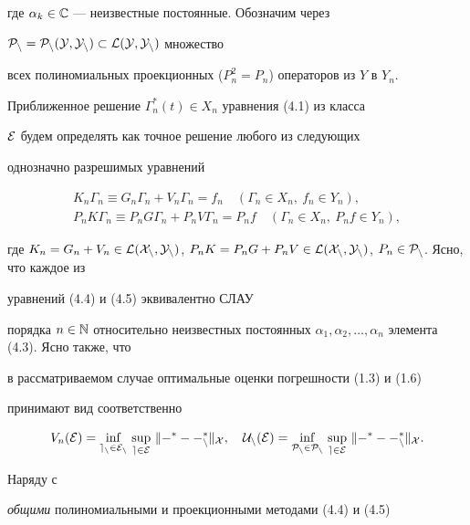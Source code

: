 где $\alpha_k\in \Bbb C$ --- неизвестные постоянные. Обозначим через


$\cal P_n=\cal P_n(Y,Y_n)\subset \cal L(Y,Y_n)$ множество


всех полиномиальных проекционных ($P_n^2=P_n$) операторов из $Y$ в $Y_n$.





Приближенное решение $\Gamma_n^*(t)\in X_n$ уравнения (4.1) из класса


$\cal E$ будем определять как точное решение любого из следующих


однозначно разрешимых уравнений


\begin{gather}


K_n\Gamma_n\equiv G_n\Gamma_n+V_n\Gamma_n=f_n\quad


(\Gamma_n\in X_n,\ f_n\in Y_n), \\


%


P_nK\Gamma_n\equiv P_nG\Gamma_n+P_nV\Gamma_n=P_nf\quad


(\Gamma_n\in X_n,\ P_nf\in Y_n),


\end{gather}


где $K_n=G_n+V_n\in \cal L(X_n, Y_n)$, $P_nK=P_nG+P_nV\in


\cal L(X_n, Y_n)$, $P_n\in \cal P_n$. Ясно, что каждое из


уравнений (4.4) и (4.5) эквивалентно СЛАУ


порядка $n \in \Bbb N$ относительно неизвестных постоянных $\alpha_1,


\alpha_2,\dotsc ,\alpha_n$ элемента (4.3). Ясно также, что


в рассматриваемом случае оптимальные оценки погрешности (1.3) и (1.6)


принимают вид соответственно


$$


V_n(\cal E)=\inf_{\mathstrut e_n\in \cal E_n}\, \sup_{e\in \cal E}\,


\|\Gamma^*-\Gamma_n^*\|_X ,\quad U_n(\cal E)=\inf_{\mathstrut P_n\in


\cal P_n}\, \sup_{e\in \cal E}\, \|\Gamma^*-\Gamma_n^*\|_X .


$$





Наряду с


{\it общими} полиномиальными и проекционными методами (4.4) и (4.5)


